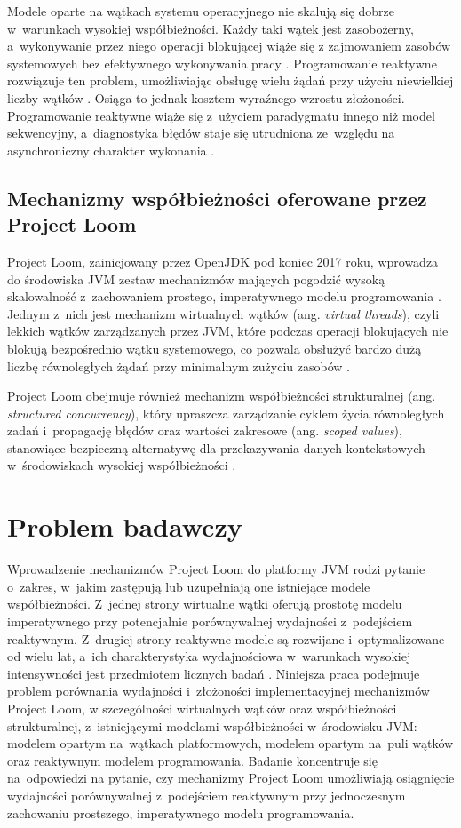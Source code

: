 Modele oparte na wątkach systemu operacyjnego nie skalują się dobrze w~warunkach wysokiej współbieżności. Każdy taki wątek jest zasobożerny, a~wykonywanie przez niego operacji blokującej wiąże się z zajmowaniem zasobów systemowych bez efektywnego wykonywania pracy \cite{tanenbaum2023,mogul1991}.
Programowanie reaktywne rozwiązuje ten problem, umożliwiając obsługę wielu żądań przy użyciu niewielkiej liczby wątków \cite{reactive-manifesto-page}. Osiąga to jednak kosztem wyraźnego wzrostu złożoności. Programowanie reaktywne wiąże się z~użyciem paradygmatu innego niż model sekwencyjny, a~diagnostyka błędów staje się utrudniona ze~względu na asynchroniczny charakter wykonania \cite{davis2019,shahoor2024}.

\subsection{Mechanizmy współbieżności oferowane przez Project Loom}

Project Loom, zainicjowany przez OpenJDK pod koniec 2017 roku, wprowadza do środowiska JVM zestaw mechanizmów mających pogodzić wysoką skalowalność z~zachowaniem prostego, imperatywnego modelu programowania \cite{openjdk-loom-proposal}. Jednym z~nich jest mechanizm wirtualnych wątków (ang. \emph{virtual threads}), czyli lekkich wątków zarządzanych przez JVM, które podczas operacji blokujących nie blokują bezpośrednio wątku systemowego, co pozwala obsłużyć bardzo dużą liczbę równoległych żądań przy minimalnym zużyciu zasobów \cite{jep444,veen2024}.

Project Loom obejmuje również mechanizm współbieżności strukturalnej (ang. \emph{structured concurrency}), który upraszcza zarządzanie cyklem życia równoległych zadań i~propagację błędów oraz wartości zakresowe (ang. \emph{scoped values}), stanowiące bezpieczną alternatywę dla przekazywania danych kontekstowych w~środowiskach wysokiej współbieżności \cite{jep525,jep506}.

\section{Problem badawczy}

Wprowadzenie mechanizmów Project Loom do platformy JVM rodzi pytanie o~zakres, w~jakim zastępują lub uzupełniają one istniejące modele współbieżności. Z~jednej strony wirtualne wątki oferują prostotę modelu imperatywnego przy potencjalnie porównywalnej wydajności z~podejściem reaktywnym. Z~drugiej strony reaktywne modele są rozwijane i~optymalizowane od wielu lat, a~ich charakterystyka wydajnościowa w~warunkach wysokiej intensywności jest przedmiotem licznych badań \cite{shahoor2024,ponnampalam2025,gustafsson2024}.
Niniejsza praca podejmuje problem porównania wydajności i~złożoności implementacyjnej mechanizmów Project Loom, w szczególności wirtualnych wątków oraz współbieżności strukturalnej, z~istniejącymi modelami współbieżności w~środowisku JVM: modelem opartym na~wątkach platformowych, modelem opartym na~puli wątków oraz reaktywnym modelem programowania. Badanie koncentruje się na~odpowiedzi na pytanie, czy mechanizmy Project Loom umożliwiają osiągnięcie wydajności porównywalnej z~podejściem reaktywnym przy jednoczesnym zachowaniu prostszego, imperatywnego modelu programowania.

